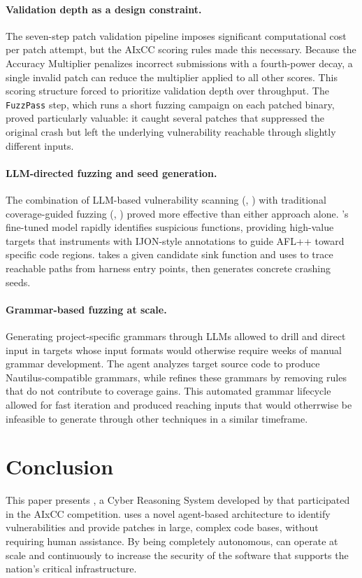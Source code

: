 \paragraph{Validation depth as a design constraint.}
The seven-step patch validation pipeline imposes significant computational cost per patch attempt, but the AIxCC scoring rules made this necessary.
Because the Accuracy Multiplier penalizes incorrect submissions with a fourth-power decay, a single invalid patch can reduce the multiplier applied to all other scores.
This scoring structure forced \artiphishell to prioritize validation depth over throughput.
The \texttt{FuzzPass} step, which runs a short fuzzing campaign on each patched binary, proved particularly valuable: it caught several patches that suppressed the original crash but left the underlying vulnerability reachable through slightly different inputs.

\paragraph{LLM-directed fuzzing and seed generation.}
The combination of LLM-based vulnerability scanning (\lluminar, \discoveryguy) with traditional coverage-guided fuzzing (\afluzzer, \aijon) proved more effective than either approach alone.
\lluminar's fine-tuned model rapidly identifies suspicious functions, providing high-value targets that \aijon instruments with IJON-style annotations to guide AFL++ toward specific code regions.
\discoveryguy takes a given candidate sink function and uses \claudefour to trace reachable paths from harness entry points, then generates concrete crashing seeds.

\paragraph{Grammar-based fuzzing at scale.}
Generating project-specific grammars through LLMs allowed \artiphishell to drill and direct input in targets whose input formats would otherwise require weeks of manual grammar development.
The \grammarguy agent analyzes target source code to produce Nautilus-compatible grammars, while \grammarroomba refines these grammars by removing rules that do not contribute to coverage gains.
This automated grammar lifecycle allowed for fast iteration and produced reaching inputs that would otherrwise be infeasible to generate through other techniques in a similar timeframe.

\section{Conclusion}
\label{conclusions}

This paper presents \artiphishell, a Cyber Reasoning System developed by \shellphish that participated in the AIxCC competition.
\artiphishell uses a novel agent-based architecture to identify vulnerabilities and provide patches in large, complex code bases, without requiring human assistance.
By being completely autonomous, \artiphishell can operate at scale and continuously to increase the security of the software that supports the nation's critical infrastructure.

